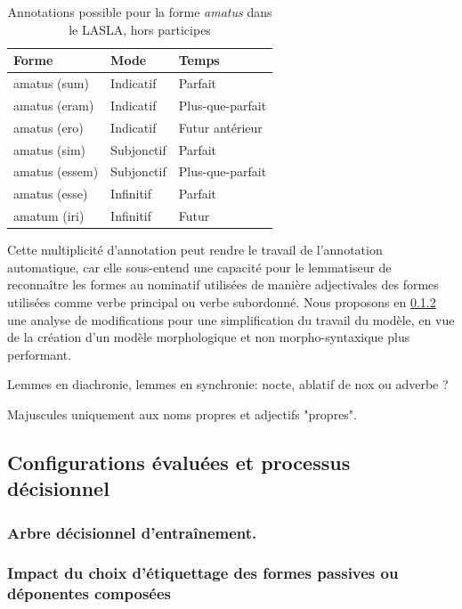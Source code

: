 
\newpara

\begin{table}[h]
\centering
\begin{tabular}{@{}lll@{}}
\toprule
Forme & Mode & Temps \\ \midrule
amatus (sum) & Indicatif & Parfait \\
amatus (eram) & Indicatif & Plus-que-parfait \\
amatus (ero) & Indicatif & Futur antérieur \\
amatus (sim) & Subjonctif & Parfait \\
amatus (essem) & Subjonctif & Plus-que-parfait \\
amatus (esse) & Infinitif & Parfait \\
amatum (iri) & Infinitif & Futur \\ \bottomrule
\end{tabular}
\caption{Annotations possible pour la forme \textit{amatus} dans le LASLA, hors participes}
\label{table:amatus_forms}
\end{table}

Cette multiplicité d'annotation peut rendre le travail de l'annotation automatique, car elle sous-entend une capacité pour le lemmatiseur de reconnaître les formes au nominatif utilisées de manière adjectivales des formes utilisées comme verbe principal ou verbe subordonné. Nous proposons en \ref{subsec:training:lasla-modification} une analyse de modifications pour une simplification du travail du modèle, en vue de la création d'un modèle morphologique et non morpho-syntaxique plus performant.

\newpara

Lemmes en diachronie, lemmes en synchronie: nocte, ablatif de nox ou adverbe ?

Majuscules uniquement aux noms propres et adjectifs "propres".

\subsection{Configurations évaluées et processus décisionnel}

\subsubsection{Arbre décisionnel d'entraînement.}




\subsubsection{Impact du choix d'étiquettage des formes passives ou déponentes composées}
\label{subsec:training:lasla-modification}

